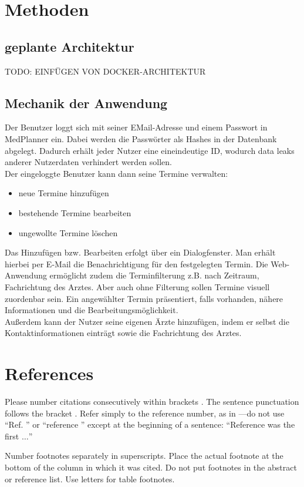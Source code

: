 \documentclass[conference]{IEEEtran}
\begin{document}
\section{Methoden}
\subsection{geplante Architektur}
TODO: EINFÜGEN VON DOCKER-ARCHITEKTUR
\subsection{Mechanik der Anwendung}
Der Benutzer loggt sich mit seiner EMail-Adresse und einem Passwort in MedPlanner ein. Dabei werden die Passwörter als Hashes in der Datenbank abgelegt. Dadurch erhält jeder Nutzer eine eineindeutige ID, wodurch data leaks anderer Nutzerdaten verhindert werden sollen.\\
Der eingeloggte Benutzer kann dann seine Termine verwalten: 
\begin{itemize}
	\item neue Termine hinzufügen
	\item bestehende Termine bearbeiten
	\item ungewollte Termine löschen
\end{itemize}
Das Hinzufügen bzw. Bearbeiten erfolgt über ein Dialogfenster.
Man erhält hierbei per E-Mail die Benachrichtigung für den festgelegten Termin.
Die Web-Anwendung ermöglicht zudem die Terminfilterung z.B. nach Zeitraum, Fachrichtung des Arztes. Aber auch ohne Filterung sollen Termine visuell zuordenbar sein. Ein angewählter Termin präsentiert, falls vorhanden, nähere Informationen und die Bearbeitungsmöglichkeit.\\
Außerdem kann der Nutzer seine eigenen Ärzte hinzufügen, indem er selbst die Kontaktinformationen einträgt sowie die Fachrichtung des Arztes.

\section*{References}

Please number citations consecutively within brackets \cite{b1}. The 
sentence punctuation follows the bracket \cite{b2}. Refer simply to the reference 
number, as in \cite{b3}---do not use ``Ref. \cite{b3}'' or ``reference \cite{b3}'' except at 
the beginning of a sentence: ``Reference \cite{b3} was the first $\ldots$''

Number footnotes separately in superscripts. Place the actual footnote at 
the bottom of the column in which it was cited. Do not put footnotes in the 
abstract or reference list. Use letters for table footnotes.
\end{document}
